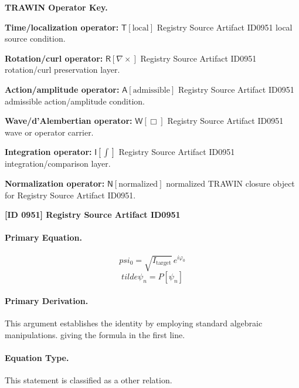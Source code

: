 \par\vspace{0.45\baselineskip}
\noindent\begin{minipage}[t]{\linewidth}
\begingroup
\small
\raggedright
\textbf{TRAWIN Operator Key.}\par
\noindent\textbf{Time/localization operator:} $\mathsf{T}\!\left[\mathrm{local}\right]$ Registry Source Artifact ID0951 local source condition.\par
\noindent\textbf{Rotation/curl operator:} $\mathsf{R}\!\left[\nabla\times\right]$ Registry Source Artifact ID0951 rotation/curl preservation layer.\par
\noindent\textbf{Action/amplitude operator:} $\mathsf{A}\!\left[\mathrm{admissible}\right]$ Registry Source Artifact ID0951 admissible action/amplitude condition.\par
\noindent\textbf{Wave/d'Alembertian operator:} $\mathsf{W}\!\left[\Box\right]$ Registry Source Artifact ID0951 wave or operator carrier.\par
\noindent\textbf{Integration operator:} $\mathsf{I}\!\left[\int\right]$ Registry Source Artifact ID0951 integration/comparison layer.\par
\noindent\textbf{Normalization operator:} $\mathsf{N}\!\left[\mathrm{normalized}\right]$ normalized TRAWIN closure object for Registry Source Artifact ID0951.\par
\endgroup
\end{minipage}

\clearpage
\noindent\textbf{[ID 0951] Registry Source Artifact ID0951}\par
\vspace{0.35em}
\paragraph{Primary Equation.}
\[
psi_0 = \sqrt{I_{\mathrm{target}}}\,e^{i\varphi_0}
\]
\[
tilde{\psi}_n = P[\psi_n]
\]

\paragraph{Primary Derivation.}
This argument establishes the identity by employing standard algebraic manipulations. giving the formula in the first line.
\paragraph{Equation Type.}
This statement is classified as a other relation.

